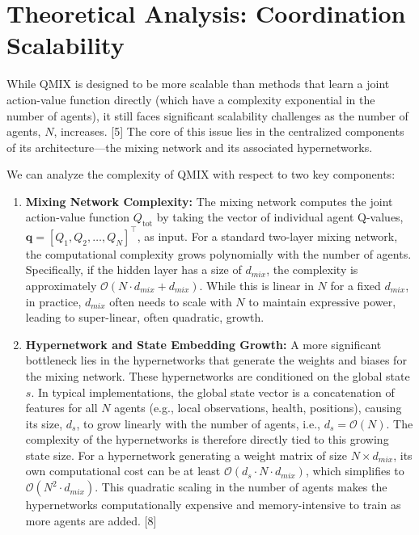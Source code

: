 \documentclass[../Main.tex]{subfiles}
\begin{document}
\section{Theoretical Analysis: Coordination Scalability}

While QMIX is designed to be more scalable than methods that learn a joint action-value function directly (which have a complexity exponential in the number of agents), it still faces significant scalability challenges as the number of agents, \(N\), increases. [5] The core of this issue lies in the centralized components of its architecture—the mixing network and its associated hypernetworks.

We can analyze the complexity of QMIX with respect to two key components:

\begin{enumerate}
    \item \textbf{Mixing Network Complexity:} The mixing network computes the joint action-value function \(Q_{\text{tot}}\) by taking the vector of individual agent Q-values, \(\mathbf{q} = [Q_1, Q_2, \dots, Q_N]^\top\), as input. For a standard two-layer mixing network, the computational complexity grows polynomially with the number of agents. Specifically, if the hidden layer has a size of \(d_{mix}\), the complexity is approximately \(\mathcal{O}(N \cdot d_{mix} + d_{mix})\). While this is linear in \(N\) for a fixed \(d_{mix}\), in practice, \(d_{mix}\) often needs to scale with \(N\) to maintain expressive power, leading to super-linear, often quadratic, growth.

    \item \textbf{Hypernetwork and State Embedding Growth:} A more significant bottleneck lies in the hypernetworks that generate the weights and biases for the mixing network. These hypernetworks are conditioned on the global state \(s\). In typical implementations, the global state vector is a concatenation of features for all \(N\) agents (e.g., local observations, health, positions), causing its size, \(d_s\), to grow linearly with the number of agents, i.e., \(d_s = \mathcal{O}(N)\). The complexity of the hypernetworks is therefore directly tied to this growing state size. For a hypernetwork generating a weight matrix of size \(N \times d_{mix}\), its own computational cost can be at least \(\mathcal{O}(d_s \cdot N \cdot d_{mix})\), which simplifies to \(\mathcal{O}(N^2 \cdot d_{mix})\). This quadratic scaling in the number of agents makes the hypernetworks computationally expensive and memory-intensive to train as more agents are added. [8]
\end{enumerate}
\end{document}
